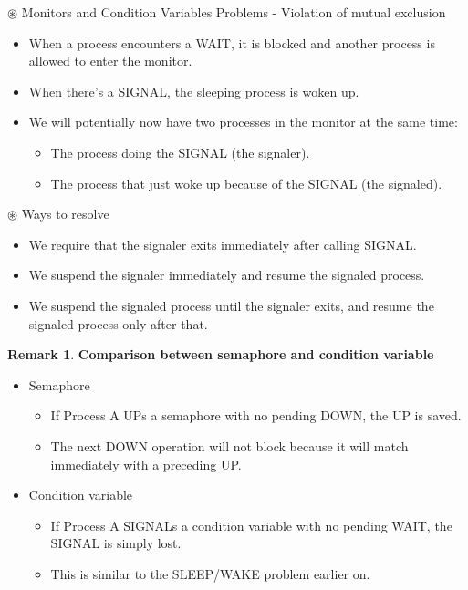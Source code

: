 \documentclass[12pt,a4paper]{article}
\theoremstyle{definition}
\newtheorem*{remark}{Remark}
\newenvironment{myitemize}
{ \begin{itemize}
    \setlength{\itemsep}{5pt}
    \setlength{\parskip}{0pt}
    \setlength{\parsep}{0pt}     }
{ \end{itemize}                  }
\begin{document}
	\textsf{$\circledast$ Monitors and Condition Variables Problems} - Violation of mutual exclusion
	\begin{myitemize}
		\item When a process encounters a WAIT, it is blocked and another process is allowed to enter the monitor.
		\item When there’s a SIGNAL, the sleeping process is woken up.
		\item We will potentially now have two processes in the monitor at the same time:
		\begin{myitemize}
			\item The process doing the SIGNAL (the signaler).
			\item The process that just woke up because of the SIGNAL (the signaled).
		\end{myitemize}
	\end{myitemize}

	\textsf{$\circledast$ Ways to resolve}
	\begin{myitemize}
		\item We require that the signaler exits immediately after calling SIGNAL.
		\item We suspend the signaler immediately and resume the signaled process.
		\item We suspend the signaled process until the signaler exits, and resume the signaled process only after that.
	\end{myitemize}
	
\begin{remark}{\textbf{Comparison between semaphore and condition variable}}

	\begin{myitemize}
		\item \textsf{Semaphore}
		\begin{myitemize}
		\item If Process A UPs a semaphore with no pending DOWN, the UP is saved.
		\item The next DOWN operation will not block because it will match immediately with a preceding UP.
		\end{myitemize}
		\item \textsf{Condition variable}
		\begin{myitemize}
		\item If Process A SIGNALs a condition variable with no pending WAIT, the SIGNAL is simply lost.
		\item This is similar to the SLEEP/WAKE problem earlier on.
		\end{myitemize}
	\end{myitemize}
\end{remark}
\end{document}
